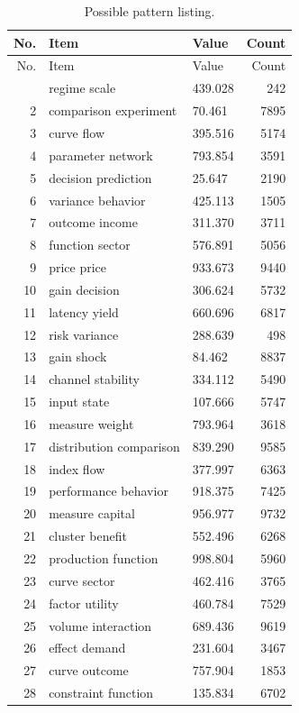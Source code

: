 \documentclass[11pt]{report}
\begin{document}
\begin{longtable}{rllr}\caption{Possible pattern listing.}\label{tab:l3}\\\toprule No. & Item & Value & Count \\ \midrule \endfirsthead\toprule No. & Item & Value & Count \\ \midrule \endhead\bottomrule \endfoot
1 & regime scale & 439.028 & 242 \\
2 & comparison experiment & 70.461 & 7895 \\
3 & curve flow & 395.516 & 5174 \\
4 & parameter network & 793.854 & 3591 \\
5 & decision prediction & 25.647 & 2190 \\
6 & variance behavior & 425.113 & 1505 \\
7 & outcome income & 311.370 & 3711 \\
8 & function sector & 576.891 & 5056 \\
9 & price price & 933.673 & 9440 \\
10 & gain decision & 306.624 & 5732 \\
11 & latency yield & 660.696 & 6817 \\
12 & risk variance & 288.639 & 498 \\
13 & gain shock & 84.462 & 8837 \\
14 & channel stability & 334.112 & 5490 \\
15 & input state & 107.666 & 5747 \\
16 & measure weight & 793.964 & 3618 \\
17 & distribution comparison & 839.290 & 9585 \\
18 & index flow & 377.997 & 6363 \\
19 & performance behavior & 918.375 & 7425 \\
20 & measure capital & 956.977 & 9732 \\
21 & cluster benefit & 552.496 & 6268 \\
22 & production function & 998.804 & 5960 \\
23 & curve sector & 462.416 & 3765 \\
24 & factor utility & 460.784 & 7529 \\
25 & volume interaction & 689.436 & 9619 \\
26 & effect demand & 231.604 & 3467 \\
27 & curve outcome & 757.904 & 1853 \\
28 & constraint function & 135.834 & 6702 \\

\end{longtable}
\end{document}
